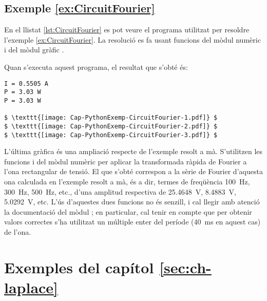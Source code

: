 \hypertarget{exemple:CircuitFourier}{\subsection{Exemple \ref*{ex:CircuitFourier} \CircuitFourier}}
En el llistat \vref{lst:CircuitFourier} es pot veure el programa utilitzat per resoldre l'exemple \vref{ex:CircuitFourier}. La resolució es fa usant funcions del mòdul numèric  i del mòdul gràfic  .


Quan s'executa aquest programa, el resultat que s'obté és:
\lstset{
	language=,
	numbers=none,
	frame=none
}
\begin{lstlisting}[mathescape=true]
I = 0.5505 A
P = 3.03 W
P = 3.03 W

$ \texttt{[image: Cap-PythonExemp-CircuitFourier-1.pdf]} $
$ \texttt{[image: Cap-PythonExemp-CircuitFourier-2.pdf]} $
$ \texttt{[image: Cap-PythonExemp-CircuitFourier-3.pdf]} $
\end{lstlisting} 

L'última gràfica és una ampliació respecte de l'exemple resolt a mà. S'utilitzen les funcions  i  del mòdul numèric  per aplicar la transformada ràpida de Fourier a l'ona rectangular de tensió. El que s'obté correspon a la sèrie de Fourier d'aquesta ona calculada en l'exemple resolt a  mà, és a dir, termes de freqüència \qty{100}{Hz}, \qty{300}{Hz}, \qty{500}{Hz}, etc., d'una amplitud respectiva de \qty{25,4648}{V}, \qty{8,4883}{V}, \qty{5,0292}{V}, etc. L'ús d'aquestes dues funcions no és senzill, i cal llegir amb atenció la documentació del mòdul ; en particular, cal tenir en compte que per obtenir valors correctes s'ha utilitzat un múltiple enter del període (\qty{40}{ms} en aquest cas) de l'ona.


\section{Exemples del capítol \ref*{sec:ch-laplace}}

